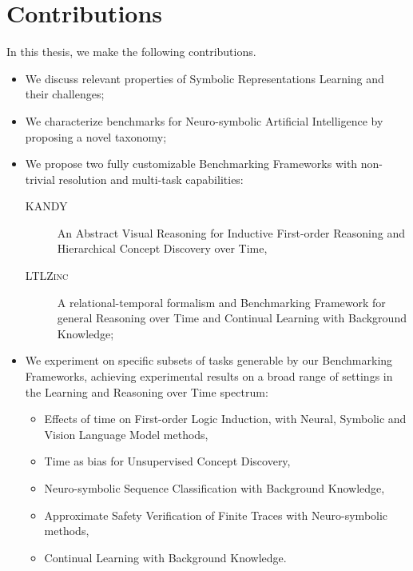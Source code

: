 \section{Contributions}
In this thesis, we make the following contributions.
\begin{itemize}
	\item We discuss relevant properties of Symbolic Representations Learning and their challenges;
	\item We characterize benchmarks for Neuro-symbolic Artificial Intelligence by proposing a novel taxonomy;
	\item We propose two fully customizable Benchmarking Frameworks with non-trivial resolution and multi-task capabilities:
	\begin{description}
		\item [\textsc{KANDY}] An Abstract Visual Reasoning for Inductive First-order Reasoning and Hierarchical Concept Discovery over Time,
		\item [\textsc{LTLZinc}] A relational-temporal formalism and Benchmarking Framework for general Reasoning over Time and Continual Learning with Background Knowledge;
	\end{description}
\item We experiment on specific subsets of tasks generable by our Benchmarking Frameworks, achieving experimental results on a broad range of settings in the Learning and Reasoning over Time spectrum:
\begin{itemize}
	\item Effects of time on First-order Logic Induction, with Neural, Symbolic and Vision Language Model methods,
	\item Time as bias for Unsupervised Concept Discovery,
	\item Neuro-symbolic Sequence Classification with Background Knowledge,
	\item Approximate Safety Verification of Finite Traces with Neuro-symbolic methods,
	\item Continual Learning with Background Knowledge.
	\end{itemize}
\end{itemize}

